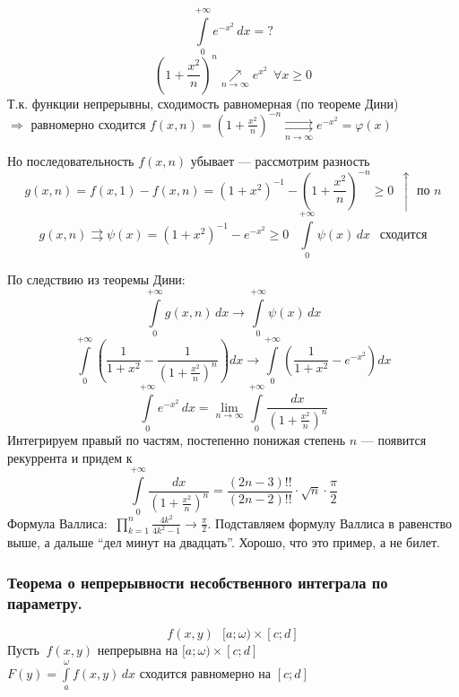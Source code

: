 \begin{example}
    \[ \int\limits_0^{+\infty} e^{-x^2}\,dx = ? \]
    \[ \left( 1 + \frac{x^2}{n} \right)^n \underset{n \to \infty}{\nearrow} e^{x^2} \ \ \forall x \ge 0 \]
    Т.к. функции непрерывны, сходимость равномерная (по теореме Дини) \\
    $\Rightarrow$ равномерно сходится $f(x, n) = \left( 1 + \frac{x^2}{n} \right)^{-n} 
    \underset{n \to \infty}{\rightrightarrows} e^{-x^2} = \varphi(x)$
    
    Но последовательность $f(x, n)$ убывает --- рассмотрим разность
    \[ g(x, n) = f(x, 1) - f(x, n) = \left( 1 + x^2 \right)^{-1} - \left( 1 + \frac{x^2}{n} \right)^{-n} \ge 0 \ \ 
    \uparrow \text{ по } n \]
    \[ g(x, n) \rightrightarrows \psi(x) = (1  +x^2)^{-1} - e^{-x^2} \ge 0 \ \ \ \int\limits_0^{+\infty} \psi(x)\,dx \ \ 
    \text{ сходится} \]
    
    По следствию из теоремы Дини:
    \[\int\limits_0^{+\infty} g(x, n)\,dx \to \int\limits_0^{+\infty} \psi(x)\,dx \]
    \[ \int\limits_0^{+\infty} \left( \frac1{1 + x^2} - \frac1{\left( 1 + \frac{x^2}n \right)^n} \right) dx \to
    \int\limits_0^{+\infty} \left( \frac1{1 + x^2} - e^{-x^2} \right) dx \]
    \[ \int\limits_0^{+\infty} e^{-x^2}\,dx = 
    \lim_{n \to \infty} \int\limits_0^{+\infty} \frac{dx}{\left( 1 + \frac{x^2}n \right)^n} \] 
    Интегрируем правый по частям, постепенно понижая степень $n$ — появится рекуррента и придем к
    \[ \int\limits_0^{+\infty} \frac{dx}{\left( 1 + \frac{x^2}n \right)^n} = 
    \frac{(2n - 3)!!}{(2n - 2)!!} \cdot \sqrt{n} \cdot \frac{\pi}2 \]
    Формула Валлиса: $\ \prod\limits_{k = 1}^n \frac{4k^2}{4k^2 - 1} \to \frac{\pi}2$. Подставляем 
    формулу Валлиса в равенство выше, а дальше ``дел минут на двадцать''. Хорошо, что это пример, а не билет.
\end{example}

\subsubsection{Теорема о непрерывности несобственного интеграла по параметру.}
\[ f(x, y) \ \ \ [a; \omega) \times [c; d] \]
Пусть $\ f(x, y)$ непрерывна на $[a; \omega) \times [c; d]$ \\
\phantom{Пусть} $F(y) = \int\limits_a^{\omega} f(x, y)\,dx$ сходится равномерно на $[c; d]$

